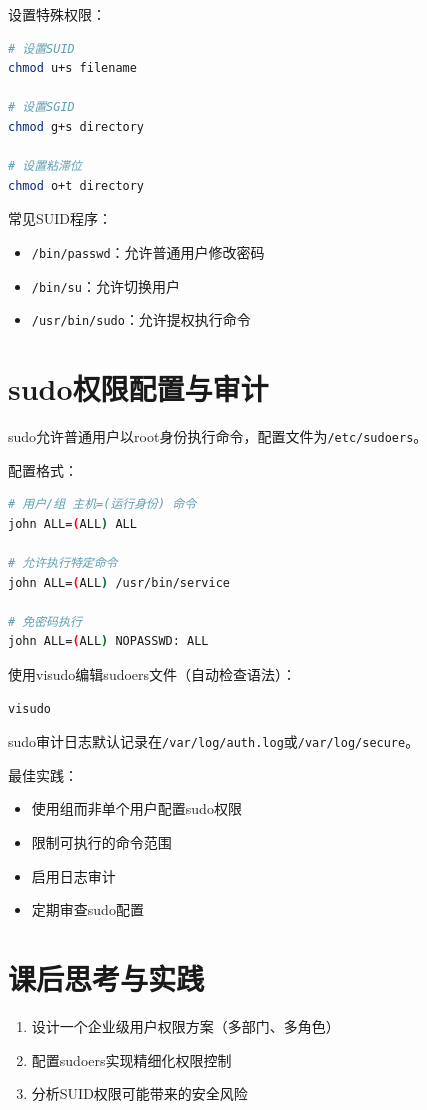 \documentclass[12pt,UTF8]{ctexbook}
\begin{document}
设置特殊权限：
\begin{lstlisting}[language=bash]
# 设置SUID
chmod u+s filename

# 设置SGID
chmod g+s directory

# 设置粘滞位
chmod o+t directory
\end{lstlisting}

常见SUID程序：
\begin{itemize}
    \item \texttt{/bin/passwd}：允许普通用户修改密码
    \item \texttt{/bin/su}：允许切换用户
    \item \texttt{/usr/bin/sudo}：允许提权执行命令
\end{itemize}

\section{sudo权限配置与审计}
\label{sec:sudo-config}

sudo允许普通用户以root身份执行命令，配置文件为\texttt{/etc/sudoers}。

配置格式：
\begin{lstlisting}[language=bash]
# 用户/组 主机=(运行身份) 命令
john ALL=(ALL) ALL

# 允许执行特定命令
john ALL=(ALL) /usr/bin/service

# 免密码执行
john ALL=(ALL) NOPASSWD: ALL
\end{lstlisting}

使用visudo编辑sudoers文件（自动检查语法）：
\begin{lstlisting}[language=bash]
visudo
\end{lstlisting}

sudo审计日志默认记录在\texttt{/var/log/auth.log}或\texttt{/var/log/secure}。

最佳实践：
\begin{itemize}
    \item 使用组而非单个用户配置sudo权限
    \item 限制可执行的命令范围
    \item 启用日志审计
    \item 定期审查sudo配置
\end{itemize}

\section{课后思考与实践}
\label{sec:permission-practice}
\begin{enumerate}
    \item 设计一个企业级用户权限方案（多部门、多角色）
    \item 配置sudoers实现精细化权限控制
    \item 分析SUID权限可能带来的安全风险
\end{enumerate}
\end{document}
